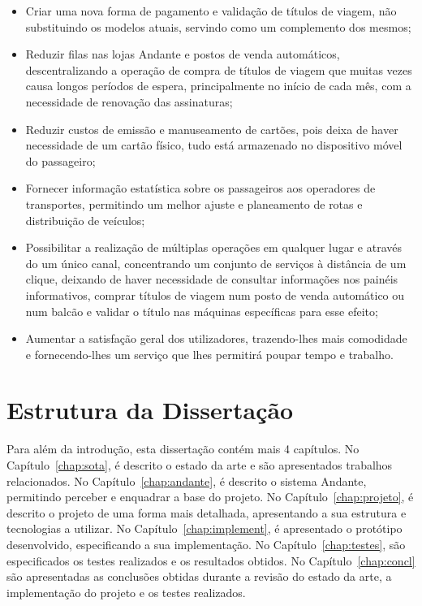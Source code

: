 \begin{itemize}
\item Criar uma nova forma de pagamento e validação de títulos de viagem, não substituindo os modelos atuais, servindo como um complemento dos mesmos;
\item Reduzir filas nas lojas Andante e postos de venda automáticos, descentralizando a operação de compra de títulos de viagem que muitas vezes causa longos períodos de espera, principalmente no início de cada mês, com a necessidade de renovação das assinaturas;
\item Reduzir custos de emissão e manuseamento de cartões, pois deixa de haver necessidade de um cartão físico, tudo está armazenado no dispositivo móvel do passageiro;
\item Fornecer informação estatística sobre os passageiros aos operadores de transportes, permitindo um melhor ajuste e planeamento de rotas e distribuição de veículos;
\item Possibilitar a realização de múltiplas operações em qualquer lugar e através do um único canal, concentrando um conjunto de serviços à distância de um clique, deixando de haver necessidade de consultar informações nos painéis informativos, comprar títulos de viagem num posto de venda automático ou num balcão e validar o título nas máquinas específicas para esse efeito;
\item Aumentar a satisfação geral dos utilizadores, trazendo-lhes mais comodidade e fornecendo-lhes um serviço que lhes permitirá poupar tempo e trabalho.
\end{itemize}

\section{Estrutura da Dissertação} \label{sec:struct}

Para além da introdução, esta dissertação contém mais 4 capítulos.
No Capítulo~\ref{chap:sota}, é descrito o estado da arte e são apresentados trabalhos relacionados. 
No Capítulo~\ref{chap:andante}, é descrito o sistema Andante, permitindo perceber e enquadrar a base do projeto.
No Capítulo~\ref{chap:projeto}, é descrito o projeto de uma forma mais detalhada, apresentando a sua estrutura e tecnologias a utilizar.
No Capítulo~\ref{chap:implement}, é apresentado o protótipo desenvolvido, especificando a sua implementação.
No Capítulo~\ref{chap:testes}, são especificados os testes realizados e os resultados obtidos.
No Capítulo~\ref{chap:concl} são apresentadas as conclusões obtidas durante a revisão do estado da arte, a implementação do projeto e os testes realizados.